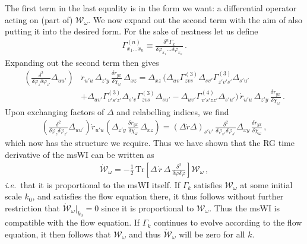 \documentclass[11pt]{book} %
\newcommand\ie{\textit{i.e.}\ }
\numberwithin{equation}{chapter}
\begin{document}
The first term in the last equality is in the form we want: a differential operator acting on (part of)
$\mathcal{W_\omega}$. We now expand out the second term with the aim of also putting it into the desired form.
For the sake of neatness let us define
\begin{align}
  \Gamma_{x_1...x_n}^{(n)} \equiv \frac{\delta^n\Gamma_k}{\delta\varphi_{x_1}...\delta\varphi_{x_n}} \,.
\end{align}
Expanding out the second term then gives
\begin{align}
\label{step1}
	\left(\frac{\delta^2}{\delta\varphi_z\delta\varphi_{z'}}\Delta_{uu'}\right)
	&\dot r_{u'u} \, \Delta_{z'y} \, \frac{\delta r_{yx}}{\delta\chi_\omega} \, \Delta_{xz}
  = \Delta_{xz} \, \bigg(\Delta_{uv}\Gamma^{(3)}_{zvs}\Delta_{sv'}\Gamma^{(3)}_{z'v's'}\Delta_{s'u'} \nonumber\\
    &+\Delta_{uv'}\Gamma^{(3)}_{v's'z'}\Delta_{s'v}\Gamma^{(3)}_{zvs}\Delta_{su'}
  -\Delta_{uv'}\Gamma^{(4)}_{v's'zz'}\Delta_{s'u'}\bigg) \,
	\dot r_{u'u} \, \Delta_{z'y} \, \frac{\delta r_{yx}}{\delta\chi_\omega} \,.
\end{align}
Upon exchanging factors of $\Delta$ and relabelling indices, we find
\begin{align}
\label{step2}
	\left(\frac{\delta^2}{\delta\varphi_{z}\delta\varphi_{z'}}\Delta_{uu'}\right)
	\dot r_{u'u}\left(\Delta_{z'y} \, \frac{\delta r_{yx}}{\delta\chi_{\omega}} \, \Delta_{xz}\right)=
	(\Delta\dot r\Delta)_{s'v'} \, \frac{\delta^2}{\delta\varphi_{v'}\delta\varphi_{s'}}
	\Delta_{xy} \, \frac{\delta r_{yx}}{\delta\chi_{\omega}} \,,
\end{align}
which now has the structure we require.
Thus we have shown that the RG time derivative of the msWI can be written as
\begin{align}
	\mathcal{\dot W}_{\omega}=-\frac{1}{2} \, \mathrm{Tr}
	\left[\Delta \, \dot r \, \Delta \, \frac{\delta^2}{\delta\varphi\delta\varphi}\right]
  \mathcal{W}_{\omega} \,,
\end{align}
\ie that it is proportional to the msWI itself.
If $\Gamma_{k}$ satisfies $\mathcal{W_\omega}$ at some initial scale $k_0$,
and satisfies the flow equation there, it thus follows without further restriction that
$\mathcal{\dot W_\omega}|_{k_{0}}=0$ since it is proportional to $\mathcal{W_\omega}$.
Thus the msWI is compatible with the flow equation.
If $\Gamma_{k}$ continues to evolve according to the flow equation,
it then follows that $\mathcal{W_\omega}$ and thus $\mathcal{\dot W_\omega}$ will be zero for all $k$.
\end{document}
